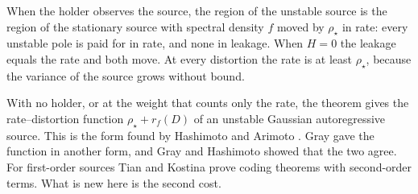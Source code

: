 \documentclass[11pt,onecolumn]{IEEEtran}
\begin{document}
When the holder observes the source, the region of the unstable source
is the region of the stationary source with spectral density $f$ moved
by $\rho_\star$ in rate: every unstable pole is paid for in rate, and
none in leakage. When $H=0$ the leakage equals the rate and both move.
At every distortion the rate is at least $\rho_\star$, because the
variance of the source grows without bound.

With no holder, or at the weight that counts only the rate, the theorem
gives the rate--distortion function $\rho_\star+r_f(D)$ of an unstable
Gaussian autoregressive source. This is the form found by Hashimoto
and Arimoto \cite{hashimoto1980}. Gray \cite{gray1970} gave the
function in another form, and Gray and Hashimoto
\cite{grayhashimoto2008} showed that the two agree. For first-order
sources Tian and Kostina \cite{tian2019} prove coding theorems with
second-order terms. What is new here is the second cost.
\end{document}
